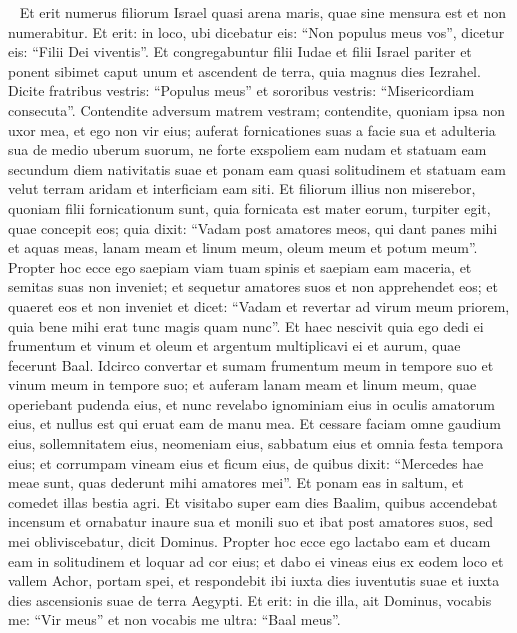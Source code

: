 \begin{biblechapter}   
\verse Et erit numerus filiorum Israel quasi arena maris, quae sine mensura est et non numerabitur. Et erit: in loco, ubi dicebatur eis: “Non populus meus vos”, dicetur eis: “Filii Dei viventis”. 
\verse Et congregabuntur filii Iudae et filii Israel pariter et ponent sibimet caput unum et ascendent de terra, quia magnus dies Iezrahel. 
\verse Dicite fratribus vestris: “Populus meus” et sororibus vestris: “Misericordiam consecuta”. 
\verse Contendite adversum matrem vestram; contendite, quoniam ipsa non uxor mea, et ego non vir eius; auferat fornicationes suas a facie sua et adulteria sua de medio uberum suorum, 
\verse ne forte exspoliem eam nudam et statuam eam secundum diem nativitatis suae et ponam eam quasi solitudinem et statuam eam velut terram aridam et interficiam eam siti. 
\verse Et filiorum illius non miserebor, quoniam filii fornicationum sunt, 
\verse quia fornicata est mater eorum, turpiter egit, quae concepit eos; quia dixit: “Vadam post amatores meos, qui dant panes mihi et aquas meas, lanam meam et linum meum, oleum meum et potum meum”. 
\verse Propter hoc ecce ego saepiam viam tuam spinis et saepiam eam maceria, et semitas suas non inveniet; 
\verse et sequetur amatores suos et non apprehendet eos; et quaeret eos et non inveniet et dicet: “Vadam et revertar ad virum meum priorem, quia bene mihi erat tunc magis quam nunc”. 
\verse Et haec nescivit quia ego dedi ei frumentum et vinum et oleum et argentum multiplicavi ei et aurum, quae fecerunt Baal. 
\verse Idcirco convertar et sumam frumentum meum in tempore suo et vinum meum in tempore suo; et auferam lanam meam et linum meum, quae operiebant pudenda eius, 
\verse et nunc revelabo ignominiam eius in oculis amatorum eius, et nullus est qui eruat eam de manu mea. 
\verse Et cessare faciam omne gaudium eius, sollemnitatem eius, neomeniam eius, sabbatum eius et omnia festa tempora eius; 
\verse et corrumpam vineam eius et ficum eius, de quibus dixit: “Mercedes hae meae sunt, quas dederunt mihi amatores mei”. Et ponam eas in saltum, et comedet illas bestia agri. 
\verse Et visitabo super eam dies Baalim, quibus accendebat incensum et ornabatur inaure sua et monili suo et ibat post amatores suos, sed mei obliviscebatur, dicit Dominus. 
\verse Propter hoc ecce ego lactabo eam et ducam eam in solitudinem et loquar ad cor eius; 
\verse et dabo ei vineas eius ex eodem loco et vallem Achor, portam spei, et respondebit ibi iuxta dies iuventutis suae et iuxta dies ascensionis suae de terra Aegypti. 
\verse Et erit: in die illa, ait Dominus, vocabis me: “Vir meus” et non vocabis me ultra: “Baal meus”. 

\end{biblechapter}
